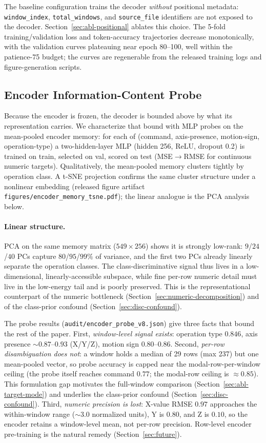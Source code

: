 \documentclass[sensors,article,submit,moreauthors,pdftex]{Definitions/mdpi}
\begin{document}
The baseline configuration trains the decoder \emph{without} positional metadata: \texttt{window\_index}, \texttt{total\_windows}, and \texttt{source\_file} identifiers are not exposed to the decoder. Section~\ref{sec:abl-positional} ablates this choice. The 5-fold training/validation loss and token-accuracy trajectories decrease monotonically, with the validation curves plateauing near epoch 80--100, well within the patience-75 budget; the curves are regenerable from the released training logs and figure-generation scripts.

\subsection{Encoder Information-Content Probe}
\label{sec:encoder-probe}

Because the encoder is frozen, the decoder is bounded above by what its representation carries. We characterize that bound with MLP probes on the mean-pooled encoder memory: for each of (command, axis-presence, motion-sign, operation-type) a two-hidden-layer MLP (hidden 256, ReLU, dropout 0.2) is trained on train, selected on val, scored on test (MSE$\to$RMSE for continuous numeric targets). Qualitatively, the mean-pooled memory clusters tightly by operation class. A t-SNE projection confirms the same cluster structure under a nonlinear embedding (released figure artifact \texttt{figures/encoder\_memory\_tsne.pdf}); the linear analogue is the PCA analysis below.

\paragraph{Linear structure.} PCA on the same memory matrix ($549 \times 256$) shows it is strongly low-rank: $9$/$24$/$40$ PCs capture $80$/$95$/$99\%$ of variance, and the first two PCs already linearly separate the operation classes. The class-discriminative signal thus lives in a low-dimensional, linearly-accessible subspace, while fine per-row numeric detail must live in the low-energy tail and is poorly preserved. This is the representational counterpart of the numeric bottleneck (Section~\ref{sec:numeric-decomposition}) and of the class-prior confound (Section~\ref{sec:disc-confound}).

The probe results (\texttt{audit/encoder\_probe\_v8.json}) give three facts that bound the rest of the paper. First, \emph{window-level signal exists}: operation type $0.846$, axis presence $\sim$$0.87$--$0.93$ (X/Y/Z), motion sign $0.80$--$0.86$. Second, \emph{per-row disambiguation does not}: a window holds a median of 29 rows (max 237) but one mean-pooled vector, so probe accuracy is capped near the modal-row-per-window ceiling (the probe itself reaches command $0.77$; the modal-row ceiling is $\approx\!0.85$). This formulation gap motivates the full-window comparison (Section~\ref{sec:abl-target-mode}) and underlies the class-prior confound (Section~\ref{sec:disc-confound}). Third, \emph{numeric precision is lost}: X-value RMSE $0.97$ approaches the within-window range ($\sim\!3.0$ normalized units), Y is $0.80$, and Z is $0.10$, so the encoder retains a window-level mean, not per-row precision. Row-level encoder pre-training is the natural remedy (Section~\ref{sec:future}).
\end{document}
